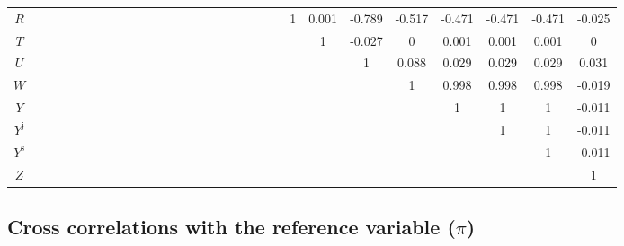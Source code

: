 \begin{tabular}{c|cccccccccccccccccccccccccccc|}
$R$ &  &  &  &  &  &  &  &  &  &  &  &  &  &  &  &  &  &  &  &  & 1 & 0.001 & -0.789 & -0.517 & -0.471 & -0.471 & -0.471 & -0.025 \\
$T$ &  &  &  &  &  &  &  &  &  &  &  &  &  &  &  &  &  &  &  &  &  & 1 & -0.027 & 0 & 0.001 & 0.001 & 0.001 & 0 \\
$U$ &  &  &  &  &  &  &  &  &  &  &  &  &  &  &  &  &  &  &  &  &  &  & 1 & 0.088 & 0.029 & 0.029 & 0.029 & 0.031 \\
$W$ &  &  &  &  &  &  &  &  &  &  &  &  &  &  &  &  &  &  &  &  &  &  &  & 1 & 0.998 & 0.998 & 0.998 & -0.019 \\
$Y$ &  &  &  &  &  &  &  &  &  &  &  &  &  &  &  &  &  &  &  &  &  &  &  &  & 1 & 1 & 1 & -0.011 \\
$Y^{\mathrm{j}}$ &  &  &  &  &  &  &  &  &  &  &  &  &  &  &  &  &  &  &  &  &  &  &  &  &  & 1 & 1 & -0.011 \\
$Y^{\mathrm{s}}$ &  &  &  &  &  &  &  &  &  &  &  &  &  &  &  &  &  &  &  &  &  &  &  &  &  &  & 1 & -0.011 \\
$Z$ &  &  &  &  &  &  &  &  &  &  &  &  &  &  &  &  &  &  &  &  &  &  &  &  &  &  &  & 1 \\
\hline
\end{tabular}


\subsection{Cross correlations with the reference variable ($\pi$)}

